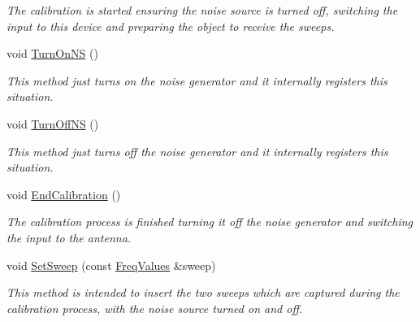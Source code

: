 \begin{DoxyCompactItemize}
\begin{DoxyCompactList}\small\item\em The calibration is started ensuring the noise source is turned off, switching the input to this device and preparing the object to receive the sweeps. \end{DoxyCompactList}\item 
\mbox{\label{classFrontEndCalibrator_a816fdd2af713e8e980a96c9242ff0180}} 
void \hyperlink{classFrontEndCalibrator_a816fdd2af713e8e980a96c9242ff0180}{Turn\+On\+NS} ()
\begin{DoxyCompactList}\small\item\em This method just turns on the noise generator and it internally registers this situation. \end{DoxyCompactList}\item 
\mbox{\label{classFrontEndCalibrator_ad29e76f2ff18f7d794fa219fab97ab53}} 
void \hyperlink{classFrontEndCalibrator_ad29e76f2ff18f7d794fa219fab97ab53}{Turn\+Off\+NS} ()
\begin{DoxyCompactList}\small\item\em This method just turns off the noise generator and it internally registers this situation. \end{DoxyCompactList}\item 
\mbox{\label{classFrontEndCalibrator_a4ba6971b00b7736b80e04a5f9ca784dc}} 
void \hyperlink{classFrontEndCalibrator_a4ba6971b00b7736b80e04a5f9ca784dc}{End\+Calibration} ()
\begin{DoxyCompactList}\small\item\em The calibration process is finished turning it off the noise generator and switching the input to the antenna. \end{DoxyCompactList}\item 
\mbox{\label{classFrontEndCalibrator_a54329452d80cfb0fbcff947803091bb7}} 
void \hyperlink{classFrontEndCalibrator_a54329452d80cfb0fbcff947803091bb7}{Set\+Sweep} (const \hyperlink{structFreqValues}{Freq\+Values} \&sweep)
\begin{DoxyCompactList}\small\item\em This method is intended to insert the two sweeps which are captured during the calibration process, with the noise source turned on and off. \end{DoxyCompactList}\item 

\end{DoxyCompactItemize}
